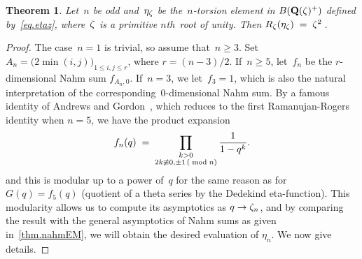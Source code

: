 \documentclass[12pt,reqno]{amsart}
\newtheorem{theorem}{Theorem}[section]
\theoremstyle{definition}
\newcommand{\changed}[1]{{#1}}
\newcommand{\frankchanged}[1]{{#1}}
\def\be{\begin{equation}}
\def\ee{\end{equation}}
\def\={\;=\;}
\def\mod{\;\text{\rm mod}\;}
\def\Q{\mathbf Q}   %
\def\nn{n}
\begin{document}
\begin{theorem}
\label{thm.eta}
Let~$\nn$ be \changed{odd} and~$\eta_\zeta$ be the~$\nn$-torsion 
element in $B(\Q(\z)^{+})$ defined by~\eqref{eq.etaz}, where~$\zeta$ is a 
primitive $\nn$th~root of unity. Then $R_\z(\eta_\z) \= \z^2\,$. 
\end{theorem}

\begin{proof} 
\frankchanged{The case~$\nn=1$ is trivial, so assume that~$\nn \ge 3$.}
Set  $A_\nn=\bigl(2\min(i,j)\bigr)_{1\le i,j\le r}$, where \changed{$r = (\nn - 3)/2$}.
\frankchanged{If~$\nn \ge 5$,}  let~$f_\nn$ be the \changed{$r$-dimensional} Nahm sum $f_{A_\nn,0}$.
\frankchanged{If~$\nn = 3$, we let~$f_{3} = 1$, which is also the natural   interpretation of the corresponding~$0$-dimensional Nahm sum.}
By a famous identity of Andrews and Gordon~\cite{Andrews}, which reduces to 
the first Ramanujan-Rogers identity when $n=5$, we have the product expansion
\be
\label{AGid}
f_\nn(q) \= 
\prod_{\begin{subarray}{c}
  k>0\\2k\not\equiv0, \pm 1 \, (\mod n) \end{subarray}} \frac{1}{1-q^k}.
  \ee
and this is modular up to a power of~$q$ for the same reason as 
for~$G(q)=f_5(q)$ (quotient of a theta series by the Dedekind eta-function). 
This modularity allows us to compute its asymptotics as $q\to\z_\nn$, and by 
comparing the result with the general asymptotics of Nahm sums as given 
in~\ref{thm.nahmEM}, we will obtain the desired evaluation of $\eta_\nn$. We 
now give details.


\end{proof}
\end{document}
